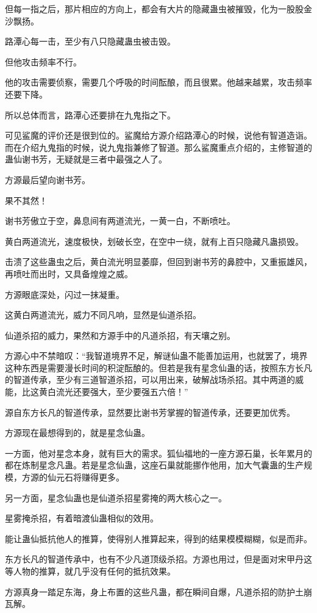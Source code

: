 \begin{this_body}
但每一指之后，那片相应的方向上，都会有大片的隐藏蛊虫被摧毁，化为一股股金沙飘扬。

路潭心每一击，至少有八只隐藏蛊虫被击毁。

但他攻击频率不行。

他的攻击需要侦察，需要几个呼吸的时间酝酿，而且很累。他越来越累，攻击频率还要下降。

所以总体而言，路潭心还要排在九鬼指之下。

可见鲨魔的评价还是很到位的。鲨魔给方源介绍路潭心的时候，说他有智道造诣。而在介绍九鬼指的时候，说九鬼指兼修了智道。那么鲨魔重点介绍的，主修智道的蛊仙谢书芳，无疑就是三者中最强之人了。

方源最后望向谢书芳。

果不其然！

谢书芳傲立于空，鼻息间有两道流光，一黄一白，不断喷吐。

黄白两道流光，速度极快，划破长空，在空中一绕，就有上百只隐藏凡蛊损毁。

击溃了这些蛊虫之后，黄白流光明显萎靡，但回到谢书芳的鼻腔中，又重振雄风，再喷吐而出时，又具备煌煌之威。

方源眼底深处，闪过一抹凝重。

这黄白两道流光，威力不同凡响，显然是仙道杀招。

仙道杀招的威力，果然和方源手中的凡道杀招，有天壤之别。

方源心中不禁暗叹：“我智道境界不足，解谜仙蛊不能善加运用，也就罢了，境界这种东西是需要漫长时间的积淀酝酿的。但若是我有星念仙蛊的话，按照东方长凡的智道传承，至少有三道智道杀招，可以用出来，破解战场杀招。其中两道的威能，比这黄白流光还要强大，至少要强五六倍！”

源自东方长凡的智道传承，显然要比谢书芳掌握的智道传承，还要更加优秀。

方源现在最想得到的，就是星念仙蛊。

一方面，他对星念本身，就有巨大的需求。狐仙福地的一座方源石巢，长年累月的都在炼制星念凡蛊。若是星念仙蛊，这座石巢就能挪作他用，加大气囊蛊的生产规模，方源的仙元石将赚得更多。

另一方面，星念仙蛊也是仙道杀招星雾掩的两大核心之一。

星雾掩杀招，有着暗渡仙蛊相似的效用。

能让蛊仙抵抗他人的推算，使得别人推算起来，得到的结果模模糊糊，似是而非。

东方长凡的智道传承中，也有不少凡道顶级杀招。方源也用过，但是面对宋甲丹这等人物的推算，就几乎没有任何的抵抗效果。

方源真身一踏足东海，身上布置的这些凡蛊，都在瞬间自爆，凡道杀招的防护土崩瓦解。


\end{this_body}
